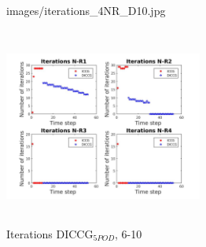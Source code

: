 \documentclass{beamer}
\begin{document}
\begin{frame}[shrink=5]
\begin{figure}[!h]
\begin{minipage}{.4\textwidth}
{images/iterations_4NR_D10.jpg}
\caption{Iterations DICCG$_{10}$}
\label{fig:NR_D10}
\end{minipage}%
\hspace{15mm}
\begin{minipage}{.4\textwidth}
 \centering
\includegraphics[width=6.5cm,height=6.5cm,keepaspectratio]
{images/iterations_4NR_POD5.jpg}
\caption{Iterations DICCG$_{5POD}$, 6-10}
\label{fig:NR_POD5}
\end{minipage}
\end{figure}
\end{frame}
\end{document}
